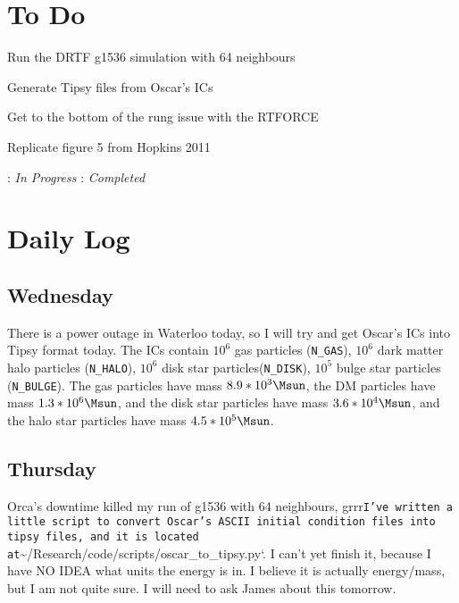 \documentclass[11pt,letterpaper]{article}
\begin{document}
\section{To Do}
\begin{bullets}
\item[\textleaf] Run the DRTF g1536 simulation with 64 neighbours
\item[\textleaf] Generate Tipsy files from Oscar's ICs
\item[\checkmark] Get to the bottom of the rung issue with the RTFORCE
\item[\textleaf] Replicate figure 5 from Hopkins 2011
\end{bullets}

\textleaf : \textit{In Progress} \qquad \checkmark : \textit{Completed}
\section{Daily Log}

\subsection{Wednesday}

There is a power outage in Waterloo today, so I will try and get Oscar's
ICs into Tipsy format today. The ICs contain $10^6$ gas particles
(\texttt{N\_GAS}), $10^6$ dark matter halo particles (\texttt{N\_HALO}),
$10^6$ disk star particles(\texttt{N\_DISK}), $10^5$ bulge star
particles (\texttt{N\_BULGE}). The gas particles have mass
$8.9*10^3\Msun$, the DM particles have mass $1.3*10^6\Msun$, and the
disk star particles have mass $3.6*10^4\Msun$, and the halo star
particles have mass $4.5*10^5\Msun$.

\subsection{Thursday}

Orca's downtime killed my run of g1536 with 64 neighbours,
grrr\texttt{I've written a little script to convert Oscar's ASCII initial condition files into tipsy files, and it is located at}\textasciitilde{}/Research/code/scripts/oscar\_to\_tipsy.py`.
I can't yet finish it, because I have NO IDEA what units the energy is
in. I believe it is actually energy/mass, but I am not quite sure. I
will need to ask James about this tomorrow.
\end{document}
